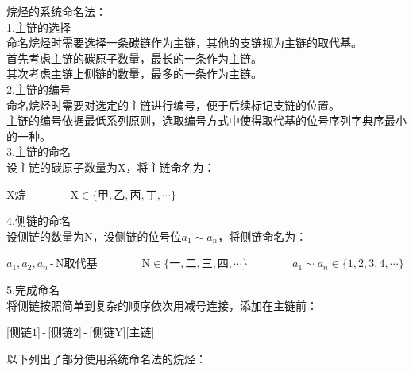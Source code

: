 \documentclass[UTF8]{ctexart}
\begin{document}
    烷烃的系统命名法：\\[4mm]
    1.主链的选择\\[3mm]
    命名烷烃时需要选择一条碳链作为主链，其他的支链视为主链的取代基。\\[3mm]
    首先考虑主链的碳原子数量，最长的一条作为主链。\\[3mm]
    其次考虑主链上侧链的数量，最多的一条作为主链。\\[6mm]
    2.主链的编号\\[3mm]
    命名烷烃时需要对选定的主链进行编号，便于后续标记支链的位置。\\[3mm]
    主链的编号依据最低系列原则，选取编号方式中使得取代基的位号序列字典序最小的一种。\\[6mm]
    3.主链的命名\\[3mm]
    设主链的碳原子数量为X，将主链命名为：
    \begin{large}
        \begin{center}
            X烷~~~~~~~~X$\in\big\{\text{甲},\text{乙},\text{丙},\text{丁},\cdots\big\}$
        \end{center}
    \end{large}\vspace{10pt}
    4.侧链的命名\\[3mm]
    设侧链的数量为N，设侧链的位号位$a_1\sim a_n$，将侧链命名为：\vspace{2pt}
    \begin{large}
        \begin{center}
            $a_1,a_2,a_n$\,-\,N取代基~~~~~~~~N$\in\big\{\text{一},\text{二},\text{三},\text{四},\cdots\big\}$~~~~~~~~$a_1\sim a_n\in\big\{1,2,3,4,\cdots\big\}$
        \end{center}
    \end{large}\vspace{15pt}
    5.完成命名\\[3mm]
    将侧链按照简单到复杂的顺序依次用减号连接，添加在主链前：
    \begin{large}
        \begin{center}
            [侧链$1$]\,-\,[侧链$2$]\,-\,[侧链Y][主链]
        \end{center}
    \end{large}\vspace{25pt}
    以下列出了部分使用系统命名法的烷烃：\vspace{5pt}
    \begin{center}
        \qquad\quad
    \end{center}
    
\end{document}
